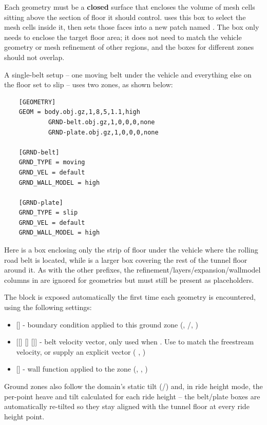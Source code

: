 Each  geometry must be a \textbf{closed} surface that encloses the volume of mesh cells sitting above the section of floor it should control.  uses this box to select the mesh cells inside it, then sets those faces into a new patch named . The box only needs to enclose the target floor area; it does not need to match the vehicle geometry or mesh refinement of other regions, and the boxes for different  zones should not overlap.

A single-belt setup -- one moving belt under the vehicle and everything else on the floor set to slip -- uses two  zones, as shown below:
\begin{lstlisting}
    [GEOMETRY]
    GEOM = body.obj.gz,1,8,5,1.1,high
            GRND-belt.obj.gz,1,0,0,0,none
            GRND-plate.obj.gz,1,0,0,0,none

    [GRND-belt]
    GRND_TYPE = moving
    GRND_VEL = default
    GRND_WALL_MODEL = high

    [GRND-plate]
    GRND_TYPE = slip
    GRND_VEL = default
    GRND_WALL_MODEL = high
\end{lstlisting}
Here  is a box enclosing only the strip of floor under the vehicle where the rolling road belt is located, while  is a larger box covering the rest of the tunnel floor around it. As with the other prefixes, the refinement/layers/expansion/wallmodel columns in \codeword{[GEOMETRY]} are ignored for  geometries but must still be present as placeholders.

The  block is exposed automatically the first time each  geometry is encountered, using the following settings:
\begin{itemize}
    \item {} [] - boundary condition applied to this ground zone (, /, )
    \item {} [[] [] []] - belt velocity vector, only used when . Use  to match the freestream velocity, or supply an explicit  vector (  , )
    \item {} [] - wall function applied to the zone (, , )
\end{itemize}

Ground zones also follow the domain's static tilt (/) and, in ride height mode, the per-point heave and tilt calculated for each ride height -- the belt/plate boxes are automatically re-tilted so they stay aligned with the tunnel floor at every ride height point.

